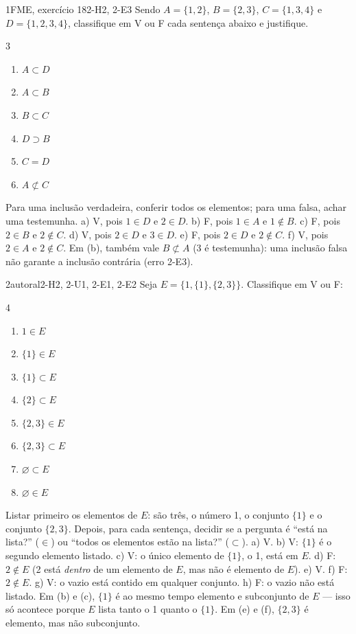 \begin{exemplo}{}{1}{FME, exercício 18}{2-H2, 2-E3}
\label{ex:u2:fme18}
Sendo $A=\{1,2\}$, $B=\{2,3\}$, $C=\{1,3,4\}$ e $D=\{1,2,3,4\}$, classifique em V ou F cada sentença abaixo e justifique.
\begin{multicols}{3}
\begin{enumerate}[label=\alph*)]
  \item $A\subset D$
  \item $A\subset B$
  \item $B\subset C$
  \item $D\supset B$
  \item $C=D$
  \item $A\not\subset C$
\end{enumerate}
\end{multicols}
\plano Para uma inclusão verdadeira, conferir todos os elementos; para uma falsa, achar uma testemunha.
\resolucao a) V, pois $1\in D$ e $2\in D$. b) F, pois $1\in A$ e $1\notin B$. c) F, pois $2\in B$ e $2\notin C$. d) V, pois $2\in D$ e $3\in D$. e) F, pois $2\in D$ e $2\notin C$. f) V, pois $2\in A$ e $2\notin C$.
\comentario Em (b), também vale $B\not\subset A$ (3 é testemunha): uma inclusão falsa não garante a inclusão contrária (erro 2-E3).
\end{exemplo}

\begin{exemplo}{}{2}{autoral}{2-H2, 2-U1, 2-E1, 2-E2}
\label{ex:u2:chaves}
Seja $E=\{1,\{1\},\{2,3\}\}$. Classifique em V ou F:
\begin{multicols}{4}
\begin{enumerate}[label=\alph*)]
  \item $1\in E$
  \item $\{1\}\in E$
  \item $\{1\}\subset E$
  \item $\{2\}\subset E$
  \item $\{2,3\}\in E$
  \item $\{2,3\}\subset E$
  \item $\varnothing\subset E$
  \item $\varnothing\in E$
\end{enumerate}
\end{multicols}
\plano Listar primeiro os elementos de $E$: são três, o número 1, o conjunto $\{1\}$ e o conjunto $\{2,3\}$. Depois, para cada sentença, decidir se a pergunta é \enquote{está na lista?} ($\in$) ou \enquote{todos os elementos estão na lista?} ($\subset$).
\resolucao a) V. b) V: $\{1\}$ é o segundo elemento listado. c) V: o único elemento de $\{1\}$, o 1, está em $E$. d) F: $2\notin E$ (2 está \emph{dentro} de um elemento de $E$, mas não é elemento de $E$). e) V. f) F: $2\notin E$. g) V: o vazio está contido em qualquer conjunto. h) F: o vazio não está listado.
\comentario Em (b) e (c), $\{1\}$ é ao mesmo tempo elemento e subconjunto de $E$ — isso só acontece porque $E$ lista tanto o 1 quanto o $\{1\}$. Em (e) e (f), $\{2,3\}$ é elemento, mas não subconjunto.
\end{exemplo}

